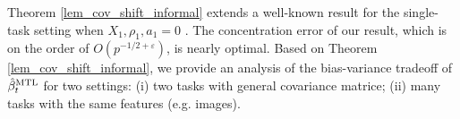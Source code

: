 Theorem \ref{lem_cov_shift_informal} extends a well-known result for the single-task setting when $X_1, \rho_1, a_1 = 0$ \cite{S07}.
The concentration error of our result, which is on the order of $O(p^{-1/2+\varepsilon})$, is nearly optimal.
Based on Theorem \ref{lem_cov_shift_informal}, we provide an analysis of the bias-variance tradeoff of $\hat{\beta}_t^{\text{MTL}}$ for two settings:
(i) two tasks with general covariance matrice; (ii) many tasks with the same features (e.g. images).

